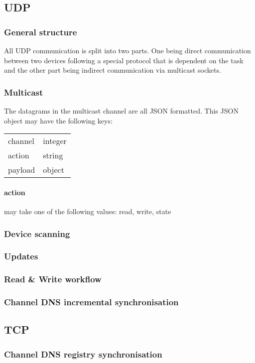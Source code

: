 \documentclass[a4paper]{article}
\begin{document}
        \subsection{UDP}
	        \subsubsection{General structure}
		        All UDP communication is split into two parts. One being direct communication between two devices
		        following a special protocol that is dependent on the task and the other part being indirect
		        communication via multicast sockets.
		    \subsubsection{Multicast}
			    The datagrams in the multicast channel are all JSON formatted. This JSON object may have the following
			    keys:\\
			    \begin{tabular}{l | l}
			        channel & integer\\
			    	action & string\\
			    	payload & object
			    \end{tabular}
			    \paragraph{action} may take one of the following values: read, write, state
	        \subsubsection{Device scanning}
            \subsubsection{Updates}
            \subsubsection{Read \& Write workflow}
            \subsubsection{Channel DNS incremental synchronisation}
        \subsection{TCP}
            \subsubsection{Channel DNS registry synchronisation}
\end{document}
